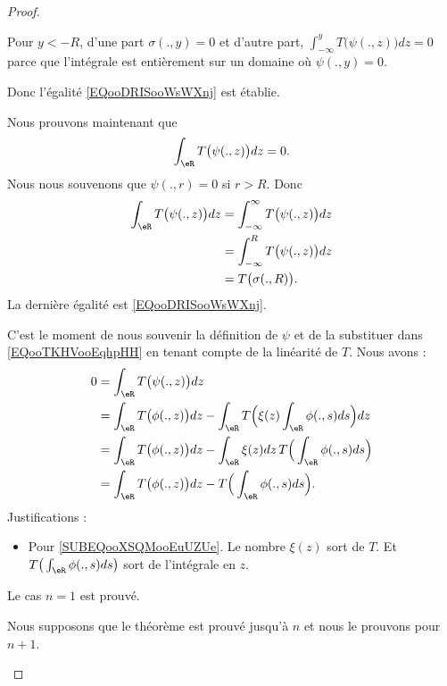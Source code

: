 \begin{proof}
\begin{subproof}
\begin{subproof}
			Pour \( y<-R\), d'une part \( \sigma(.,y)=0\) et d'autre part, \( \int_{-\infty}^yT\big( \psi(.,z) \big)dz=0\) parce que l'intégrale est entièrement sur un domaine où \( \psi(.,y)=0\).

			Donc l'égalité \eqref{EQooDRISooWsWXnj} est établie.

			Nous prouvons maintenant que
			\begin{equation}     \label{EQooTKHVooEqhpHH}
				\int_{\eR}T\big( \psi(.,z) \big)dz=0.
			\end{equation}
			Nous nous souvenons que \( \psi(.,r)=0\) si \( r>R\). Donc
			\begin{subequations}
				\begin{align}
					\int_{\eR}T\big( \psi(.,z) \big)dz & =\int_{-\infty}^{\infty}T\big( \psi(.,z) \big)dz \\
					                                   & =\int_{-\infty}^RT\big( \psi(.,z) \big)dz        \\
					                                   & =T\big( \sigma(.,R) \big).
				\end{align}
			\end{subequations}
			La dernière égalité est \eqref{EQooDRISooWsWXnj}.

			C'est le moment de nous souvenir la définition de \( \psi\) et de la substituer dans \eqref{EQooTKHVooEqhpHH} en tenant compte de la linéarité de \( T\). Nous avons :
			\begin{subequations}
				\begin{align}
					0 & =\int_{\eR}T\big( \psi(.,z) \big)dz                                                                                    \\
					  & =\int_{\eR}T\big( \phi(.,z) \big)dz-\int_{\eR}T\Big( \xi(z)\int_{\eR}\phi(.,s)ds \Big)dz                               \\
					  & =\int_{\eR}T\big( \phi(.,z) \big)dz-\int_{\eR}\xi(z)dz\,T\Big( \int_{\eR}\phi(.,s)ds \Big) \label{SUBEQooXSQMooEuUZUe} \\
					  & =\int_{\eR}T\big( \phi(.,z) \big)dz-T\Big( \int_{\eR}\phi(.,s)ds \Big).
				\end{align}
			\end{subequations}
			Justifications :
			\begin{itemize}
				\item Pour \eqref{SUBEQooXSQMooEuUZUe}. Le nombre \( \xi(z)\) sort de \( T\). Et \( T\big( \int_{\eR}\phi(.,s)ds \big)\) sort de l'intégrale en \( z\).
			\end{itemize}
			Le cas \( n=1\) est prouvé.
		\end{subproof}
		\spitem[La récurrence]
		Nous supposons que le théorème est prouvé jusqu'à \( n\) et nous le prouvons pour \( n+1\).


\end{subproof}
\end{proof}
